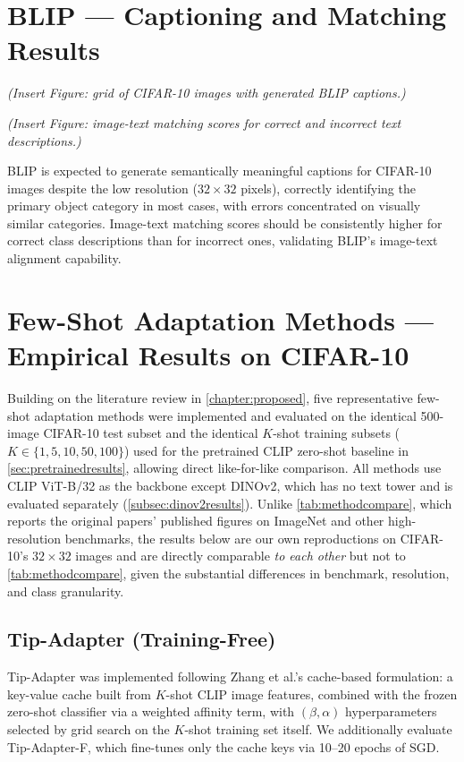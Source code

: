 \documentclass{iutbscthesis}
\begin{document}
\section{BLIP --- Captioning and Matching Results}

\textit{(Insert Figure: grid of CIFAR-10 images with generated BLIP captions.)}

\textit{(Insert Figure: image-text matching scores for correct and incorrect text descriptions.)}

BLIP is expected to generate semantically meaningful captions for CIFAR-10 images despite the low resolution ($32\times32$ pixels), correctly identifying the primary object category in most cases, with errors concentrated on visually similar categories. Image-text matching scores should be consistently higher for correct class descriptions than for incorrect ones, validating BLIP's image-text alignment capability.

\section{Few-Shot Adaptation Methods --- Empirical Results on CIFAR-10} \label{sec:adaptationresults}

Building on the literature review in \autoref{chapter:proposed}, five representative few-shot adaptation methods were implemented and evaluated on the identical 500-image CIFAR-10 test subset and the identical $K$-shot training subsets ($K \in \{1, 5, 10, 50, 100\}$) used for the pretrained CLIP zero-shot baseline in \autoref{sec:pretrainedresults}, allowing direct like-for-like comparison. All methods use CLIP ViT-B/32 as the backbone except DINOv2, which has no text tower and is evaluated separately (\autoref{subsec:dinov2results}). Unlike \autoref{tab:methodcompare}, which reports the original papers' published figures on ImageNet and other high-resolution benchmarks, the results below are our own reproductions on CIFAR-10's $32\times32$ images and are directly comparable \emph{to each other} but not to \autoref{tab:methodcompare}, given the substantial differences in benchmark, resolution, and class granularity.

\subsection{Tip-Adapter (Training-Free)}

Tip-Adapter \cite{zhang2022tipadapter} was implemented following Zhang et al.'s cache-based formulation: a key-value cache built from $K$-shot CLIP image features, combined with the frozen zero-shot classifier via a weighted affinity term, with $(\beta, \alpha)$ hyperparameters selected by grid search on the $K$-shot training set itself. We additionally evaluate Tip-Adapter-F, which fine-tunes only the cache keys via 10--20 epochs of SGD.
\end{document}
